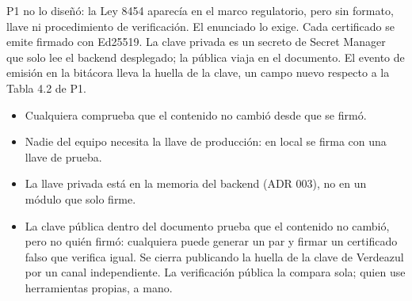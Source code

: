 \documentclass[11pt,a4paper]{article}
\theoremstyle{definition}
\theoremstyle{remark}
\begin{document}
\adrctx P1 no lo diseñó: la Ley 8454 aparecía en el marco regulatorio, pero sin
formato, llave ni procedimiento de verificación. El enunciado lo exige.
\adrdec Cada certificado se emite firmado con Ed25519. La clave privada es un
secreto de Secret Manager que solo lee el backend desplegado; la pública viaja
en el documento. El evento de emisión en la bitácora lleva la huella de la
clave, un campo nuevo respecto a la Tabla 4.2 de P1.
\adrpos
\begin{itemize}
  \item Cualquiera comprueba que el contenido no cambió desde que se firmó.
  \item Nadie del equipo necesita la llave de producción: en local se firma
    con una llave de prueba.
\end{itemize}
\adrneg
\begin{itemize}
  \item La llave privada está en la memoria del backend (ADR 003), no en un
    módulo que solo firme.
  \item La clave pública dentro del documento prueba que el contenido no
    cambió, pero no quién firmó: cualquiera puede generar un par y firmar un
    certificado falso que verifica igual. Se cierra publicando la huella de la
    clave de Verdeazul por un canal independiente. La verificación pública la
    compara sola; quien use herramientas propias, a mano.
\end{itemize}
\end{document}
